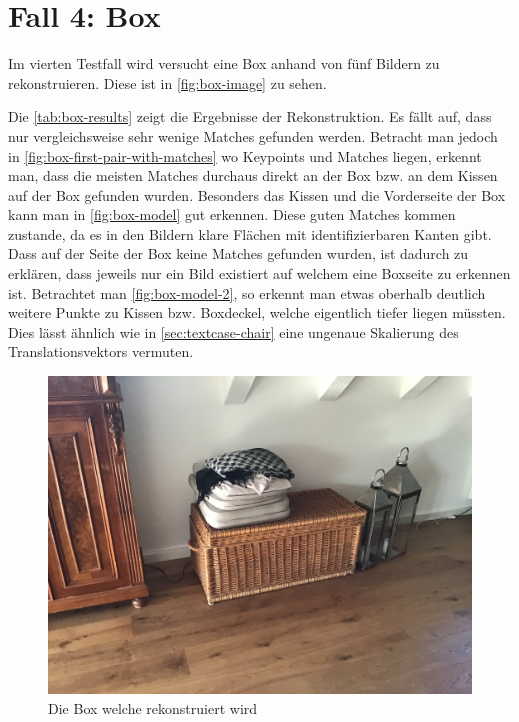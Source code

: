 \section{Fall 4: Box}
\label{sec:testcase-box}
Im vierten Testfall wird versucht eine Box anhand von fünf Bildern zu rekonstruieren.
Diese ist in \autoref{fig:box-image} zu sehen.

Die \autoref{tab:box-results} zeigt die Ergebnisse der Rekonstruktion.
Es fällt auf, dass nur vergleichsweise sehr wenige Matches gefunden werden.
Betracht man jedoch in \autoref{fig:box-first-pair-with-matches} wo Keypoints und Matches liegen, erkennt man, dass die meisten Matches durchaus direkt an der Box bzw. an dem Kissen auf der Box gefunden wurden.
Besonders das Kissen und die Vorderseite der Box kann man in \autoref{fig:box-model} gut erkennen.
Diese guten Matches kommen zustande, da es in den Bildern klare Flächen mit identifizierbaren Kanten gibt.
Dass auf der Seite der Box keine Matches gefunden wurden, ist dadurch zu erklären, dass jeweils nur ein Bild existiert auf welchem eine Boxseite zu erkennen ist.
Betrachtet man \autoref{fig:box-model-2}, so erkennt man etwas oberhalb deutlich weitere Punkte zu Kissen bzw. Boxdeckel, welche eigentlich tiefer liegen müssten.
Dies lässt ähnlich wie in \autoref{sec:textcase-chair} eine ungenaue Skalierung des Translationsvektors vermuten.

\begin{figure}
    \includegraphics[width=\textwidth]{src/img/box.jpg}
    \caption{Die Box welche rekonstruiert wird}
    \label{fig:box-image}
\end{figure}

